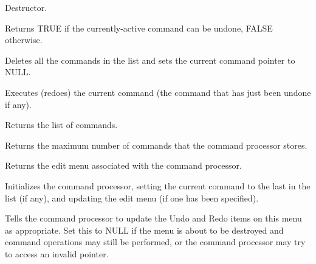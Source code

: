 
Destructor.



Returns TRUE if the currently-active command can be undone, FALSE otherwise.



Deletes all the commands in the list and sets the current command pointer to NULL.



Executes (redoes) the current command (the command that has just been undone if any).



Returns the list of commands.



Returns the maximum number of commands that the command processor stores.



Returns the edit menu associated with the command processor.



Initializes the command processor, setting the current command to the
last in the list (if any), and updating the edit menu (if one has been
specified).



Tells the command processor to update the Undo and Redo items on this
menu as appropriate. Set this to NULL if the menu is about to be
destroyed and command operations may still be performed, or the command
processor may try to access an invalid pointer.


